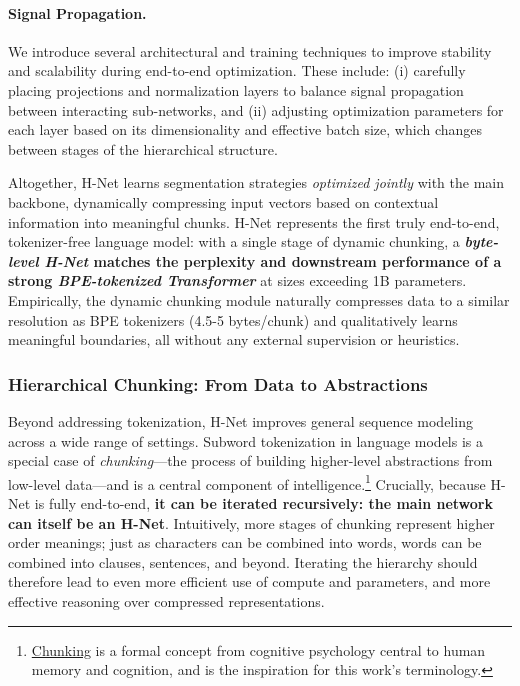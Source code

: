 \paragraph{Signal Propagation.}
We introduce several architectural and training techniques to improve stability and scalability during end-to-end optimization. 
These include: (i) carefully placing projections and normalization layers to balance signal propagation between interacting sub-networks, and (ii) adjusting optimization parameters for each layer based on its dimensionality and effective batch size, which changes between stages of the hierarchical structure.

Altogether, H-Net learns segmentation strategies \emph{optimized jointly} with the main backbone, dynamically compressing input vectors based on contextual information into meaningful chunks.
H-Net represents the first truly end-to-end, tokenizer-free language model:
with a single stage of dynamic chunking, a \textbf{\emph{byte-level H-Net} matches the perplexity and downstream performance of a strong \emph{BPE-tokenized Transformer}} at sizes exceeding 1B parameters. Empirically, the dynamic chunking module naturally compresses data to a similar resolution as BPE tokenizers (4.5-5 bytes/chunk) and qualitatively learns meaningful boundaries, all without any external supervision or heuristics.



\vspace*{1em}

\subsubsection*{Hierarchical Chunking: From Data to Abstractions}


Beyond addressing tokenization, H-Net improves general sequence modeling across a wide range of settings.
Subword tokenization in language models is a special case of \emph{chunking}---the process of building higher-level abstractions from low-level data---and is a central component of intelligence.\footnote{\href{https://en.wikipedia.org/wiki/Chunking_(psychology)}{Chunking} is a formal concept from cognitive psychology central to human memory and cognition, and is the inspiration for this work's terminology.}
Crucially, because H-Net is fully end-to-end, \textbf{it can be iterated recursively: the main network can itself be an H-Net}.
Intuitively, more stages of chunking represent higher order meanings; just as characters can be combined into words, words can be combined into clauses, sentences, and beyond.
Iterating the hierarchy should therefore lead to even more efficient use of compute and parameters, and more effective reasoning over compressed representations.


